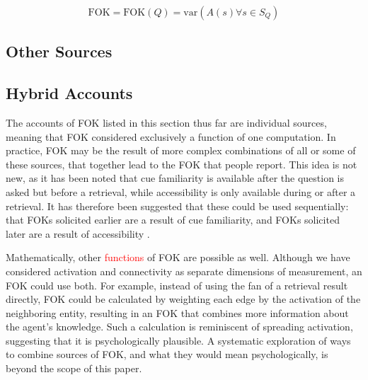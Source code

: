 \documentclass[10pt,letterpaper]{article}
\newcommand{\fixme}[2][]{#2}
\renewcommand{\fixme}[2][]{\textcolor{red}{#2}}
\newcommand{\fok}[0]{\text{FOK}}
\begin{document}
$$\fok = \fok(Q) = \text{var}(A(s) \forall s \in S_Q)$$


\subsection{Other Sources}


\subsection{Hybrid Accounts}

The accounts of FOK listed in this section thus far are individual sources, meaning that FOK considered exclusively a function of one computation.
In practice, FOK may be the result of more complex combinations of all or some of these sources, that together lead to the FOK that people report.
This idea is not new, as it has been noted that cue familiarity is available after the question is asked but before a retrieval, while accessibility is only available during or after a retrieval.
It has therefore been suggested that these could be used sequentially: that FOKs solicited earlier are a result of cue familiarity, and FOKs solicited later are a result of accessibility \cite{Florer2000FeelingsOfKnowing,Koriat2001TheCombinedContributions}.

Mathematically, other \fixme{functions} of FOK are possible as well.
Although we have considered activation and connectivity as separate dimensions of measurement, an FOK could use both.
For example, instead of using the fan of a retrieval result directly, FOK could be calculated by weighting each edge by the activation of the neighboring entity, resulting in an FOK that combines more information about the agent's knowledge.
Such a calculation is reminiscent of spreading activation, suggesting that it is psychologically plausible.
A systematic exploration of ways to combine sources of FOK, and what they would mean psychologically, is beyond the scope of this paper.
\end{document}
